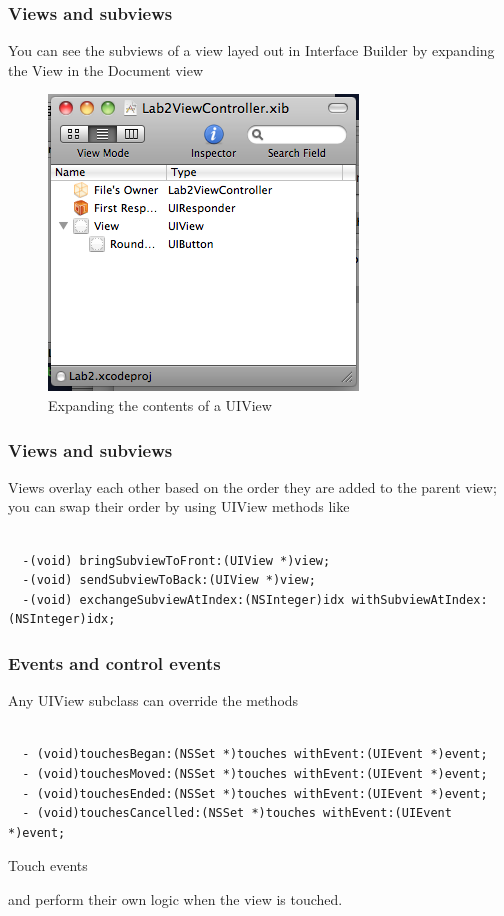 \documentclass[10pt]{beamer}
\begin{document}
\begin{frame}[fragile]
  \frametitle{Views and subviews}
  You can see the subviews of a view layed out in Interface Builder by expanding the View in the Document view \begin{figure}[htb]
  \begin{center}

  \includegraphics[scale=0.5]{UIViewExpand.png}

  \caption{Expanding the contents of a UIView}
  \end{center}
  \end{figure}

\end{frame}

\begin{frame}[fragile]
  \frametitle{Views and subviews}
  Views overlay each other based on the order they are added to the parent view; you can swap their order by using UIView methods like \begin{verbatim}

  -(void) bringSubviewToFront:(UIView *)view;
  -(void) sendSubviewToBack:(UIView *)view;
  -(void) exchangeSubviewAtIndex:(NSInteger)idx withSubviewAtIndex:(NSInteger)idx;

  \end{verbatim}

\end{frame}

    
\begin{frame}[fragile]
  \frametitle{Events and control events}
  Any UIView subclass can override the methods
\begin{listing}[H]
    \begin{verbatim}

  - (void)touchesBegan:(NSSet *)touches withEvent:(UIEvent *)event;
  - (void)touchesMoved:(NSSet *)touches withEvent:(UIEvent *)event;
  - (void)touchesEnded:(NSSet *)touches withEvent:(UIEvent *)event;
  - (void)touchesCancelled:(NSSet *)touches withEvent:(UIEvent *)event;

  \end{verbatim}
    \caption{Touch events}
    \label{listing:29}
  \end{listing}

and perform their own logic when the view is touched.

\end{frame}
\end{document}
